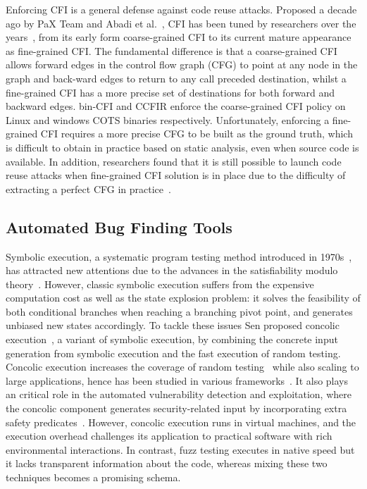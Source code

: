 Enforcing CFI is a general defense against code reuse attacks. Proposed a decade ago by PaX Team and Abadi et al.~\cite{paxcfi,abadi2005control}, CFI has been tuned by researchers over the years~\cite{ifccvtv,rockjit,picfi,ccfi,opaquecfi,rapteampax}, from its early form coarse-grained CFI to its current mature appearance as fine-grained CFI. The fundamental difference is that a coarse-grained CFI allows forward edges in the control flow graph (CFG) to point at any node in the graph and back-ward edges to return to any call preceded destination, whilst a fine-grained CFI has a more precise set of destinations for both forward and backward edges. bin-CFI \cite{bincfi} and CCFIR \cite{ccfir} enforce the coarse-grained CFI policy on Linux and windows COTS binaries respectively. Unfortunately, enforcing a fine-grained CFI requires a more precise CFG to be built as the ground truth, which is difficult to obtain in practice based on static analysis, even when source code is available. In addition, researchers found that it is still possible to launch code reuse attacks when fine-grained CFI solution is in place due to the difficulty of extracting a perfect CFG in practice~\cite{outofcontrol,stitchinggadget,controlflowbending,controljujutsu}.

\subsection{Automated Bug Finding Tools}
Symbolic execution, a systematic program testing method
introduced in 1970s~\cite{King76, Howden77}, has attracted new attentions due
to the advances in the satisfiability modulo theory~\cite{GaneshD07, MouraDS07,MouraB11}.
However, classic symbolic execution suffers from the expensive
computation cost as well as the state explosion problem:
it solves the feasibility of both conditional branches when
reaching a branching pivot point, and generates unbiased
new states accordingly. To tackle these issues Sen proposed
concolic execution~\cite{Sen07a}, a variant of symbolic execution,
by combining the concrete input generation from symbolic
execution and the fast execution of random testing. Concolic
execution increases the coverage of random testing~\cite{sage,GodefroidKS05}
while also scaling to large applications, hence has been studied
in various frameworks~\cite{SenA06,SenMA05,BurnimS08,s2e}. It also plays an critical
role in the automated vulnerability detection and exploitation,
where the concolic component generates security-related input
by incorporating extra safety predicates~\cite{ChaARB12,AEG}. However,
concolic execution runs in virtual machines, and the execution
overhead challenges its application to practical software
with rich environmental interactions. In contrast, fuzz testing
executes in native speed but it lacks transparent information 
about the code, whereas mixing these two techniques becomes
a promising schema.

